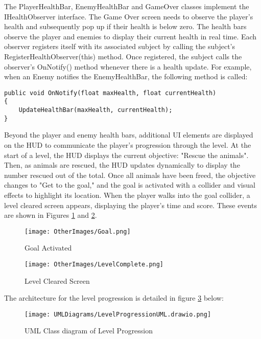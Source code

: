 \documentclass[10pt]{final_report}
\begin{document}
The PlayerHealthBar, EnemyHealthBar and GameOver classes implement the IHealthObserver interface. The Game Over screen needs to observe the player's health and subsequently pop up if their health is below zero. 
The health bars observe the player and enemies to display their current health in real time. Each observer registers itself with its associated subject by calling the subject's RegisterHealthObserver(this) method. Once registered, the subject calls the observer's OnNotify() method whenever there is a health update. For example, when an Enemy notifies the EnemyHealthBar, the following method is called:
\begin{verbatim}
public void OnNotify(float maxHealth, float currentHealth)
{
    UpdateHealthBar(maxHealth, currentHealth);
}
\end{verbatim}

Beyond the player and enemy health bars, additional UI elements are displayed on the HUD to communicate the player's progression through the level. At the start of a level, the HUD displays the current objective: "Rescue the animals". Then, as animals are rescued, the HUD updates dynamically to display the number rescued out of the total. Once all animals have been freed, the objective changes to "Get to the goal," and the goal is activated with a collider and visual effects to highlight its location. When the player walks into the goal collider, a level cleared screen appears, displaying the player's time and score. These events are shown in Figures \ref{fig:label_goal} and \ref{fig:label_levelcleared}. 
\begin{figure}[H]
    \centering
    \texttt{[image: OtherImages/Goal.png]}
    \caption{Goal Activated}
    \label{fig:label_goal}
\end{figure}

\begin{figure}[H]
    \centering
    \texttt{[image: OtherImages/LevelComplete.png]}
    \caption{Level Cleared Screen}
    \label{fig:label_levelcleared}
\end{figure}

The architecture for the level progression is detailed in figure \ref{fig:label_levelprogression} below:

\begin{figure}[H]
    \centering
    \texttt{[image: UMLDiagrams/LevelProgressionUML.drawio.png]}
    \caption{UML Class diagram of Level Progression}
    \label{fig:label_levelprogression}
\end{figure}
\end{document}
